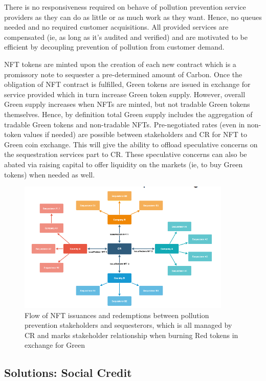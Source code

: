 \documentclass{article}
\begin{document}
There is no responsiveness required on behave of pollution prevention service providers as they can do as little or as much work as they want. Hence, no queues needed and no required customer acquisitions. All provided services are compensated (ie, as long as it's audited and verified) and are motivated to be efficient by decoupling prevention of pollution from customer demand.

NFT tokens are minted upon the creation of each new contract which is a promissory note to sequester a pre-determined amount of Carbon. Once the obligation of NFT contract is fulfilled, Green tokens are issued in exchange for service provided which in turn increase Green token supply. However, overall Green supply increases when NFTs are minted, but not tradable Green tokens themselves. Hence, by definition total Green supply includes the aggregation of tradable Green tokens and non-tradable NFTs. Pre-negotiated rates (even in non-token values if needed) are possible between stakeholders and CR for NFT to Green coin exchange. This will give the ability to offload speculative concerns on the sequestration services part to CR. These speculative concerns can also be abated via raising capital to offer liquidity on the markets (ie, to buy Green tokens) when needed as well.

\begin{figure}[h]
\centering
\includegraphics[width=4in]{red_green_issue.png}
\caption{Flow of NFT issuances and redemptions between pollution prevention stakeholders and sequesterors, which is all managed by CR and marks stakeholder relationship when burning Red tokens in exchange for Green} 
\label{fig:red_green_issue}
\end{figure} 

\subsection{Solutions: Social Credit}
\end{document}
